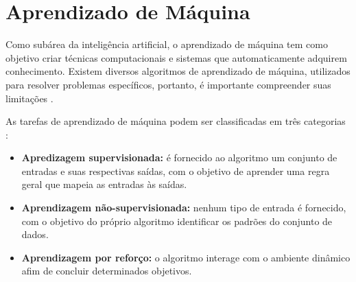 \section{Aprendizado de Máquina}

Como subárea da inteligência artificial, o aprendizado de máquina tem como objetivo criar técnicas computacionais e sistemas que automaticamente adquirem conhecimento. Existem diversos algoritmos de aprendizado de máquina, utilizados para resolver problemas específicos, portanto, é importante compreender suas limitações \cite{rezende2003}.

As tarefas de aprendizado de máquina podem ser classificadas em três categorias \cite{russel2003}:

\begin{itemize}
    \item \textbf{Apredizagem supervisionada:} é fornecido ao algoritmo um conjunto de entradas e suas respectivas saídas, com o objetivo de aprender uma regra geral que mapeia as entradas às saídas.
    \item \textbf{Aprendizagem não-supervisionada:} nenhum tipo de entrada é fornecido, com o objetivo do próprio algoritmo identificar os padrões do conjunto de dados.
    \item \textbf{Aprendizagem por reforço:} o algoritmo interage com o ambiente dinâmico afim de concluir determinados objetivos.
\end{itemize}





